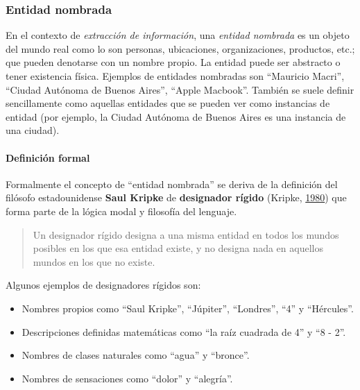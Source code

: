 \documentclass[12pt,a4paper,]{scrartcl}
\providecommand{\tightlist}{%
  \setlength{\itemsep}{0pt}\setlength{\parskip}{0pt}}
\let\oldparagraph\paragraph
\renewcommand{\paragraph}[1]{\oldparagraph{#1}\mbox{}}
\begin{document}
\hypertarget{entidad-nombrada}{%
\subsubsection{Entidad nombrada}\label{entidad-nombrada}}

En el contexto de \emph{extracción de información}, una \emph{entidad nombrada} es un objeto del mundo real como lo son personas, ubicaciones, organizaciones, productos, etc.; que pueden denotarse con un nombre propio. La entidad puede ser abstracto o tener existencia física. Ejemplos de entidades nombradas son \enquote{Mauricio Macri}, \enquote{Ciudad Autónoma de Buenos Aires}, \enquote{Apple Macbook}.
También se suele definir sencillamente como aquellas entidades que se pueden ver como instancias de entidad (por ejemplo, la Ciudad Autónoma de Buenos Aires es una instancia de una ciudad).

\hypertarget{ner-formal}{%
\paragraph{Definición formal}\label{ner-formal}}

Formalmente el concepto de \enquote{entidad nombrada} se deriva de la definición del filósofo estadounidense \textbf{Saul Kripke} de \textbf{designador rígido} (Kripke, \protect\hyperlink{ref-kripke1980naming}{1980}) que forma parte de la lógica modal y filosofía del lenguaje.

\begin{quote}
Un designador rígido designa a una misma entidad en todos los mundos posibles en los que esa entidad existe, y no designa nada en aquellos mundos en los que no existe.
\end{quote}

Algunos ejemplos de designadores rígidos son:

\begin{itemize}
\tightlist
\item
  Nombres propios como \enquote{Saul Kripke}, \enquote{Júpiter}, \enquote{Londres}, \enquote{4} y \enquote{Hércules}.
\item
  Descripciones definidas matemáticas como \enquote{la raíz cuadrada de 4} y \enquote{8 - 2}.
\item
  Nombres de clases naturales como \enquote{agua} y \enquote{bronce}.
\item
  Nombres de sensaciones como \enquote{dolor} y \enquote{alegría}.
\end{itemize}
\end{document}
